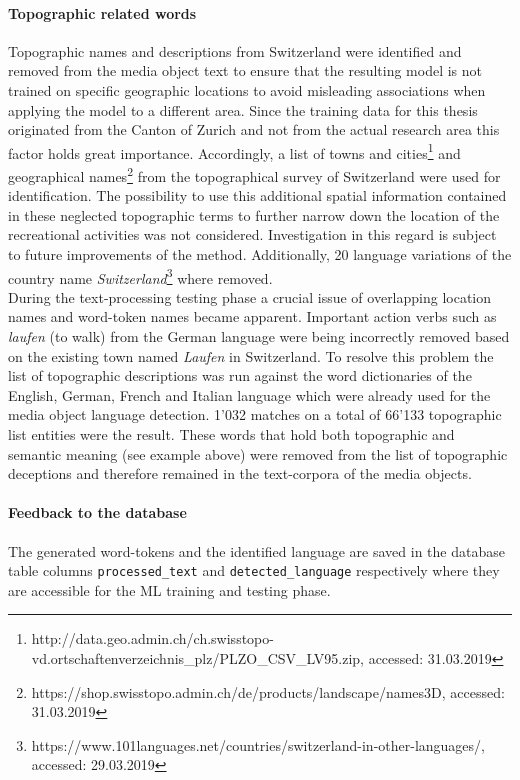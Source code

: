 \paragraph*{Topographic related words}
Topographic names and descriptions from Switzerland were identified and removed from the media object text to ensure that the resulting model is not trained on specific geographic locations to avoid misleading associations when applying the model to a different area. Since the training data for this thesis originated from the Canton of Zurich and not from the actual research area this factor holds great importance. Accordingly, a list of towns and cities\footnote{http://data.geo.admin.ch/ch.swisstopo-vd.ortschaftenverzeichnis\_plz/PLZO\_CSV\_LV95.zip, accessed: 31.03.2019} and geographical names\footnote{https://shop.swisstopo.admin.ch/de/products/landscape/names3D, accessed: 31.03.2019} from the topographical survey of Switzerland were used for identification. 
The possibility to use this additional spatial information contained in these neglected topographic terms to further narrow down the location of the recreational activities was not considered. Investigation in this regard is subject to future improvements of the method. Additionally, 20 language variations of the country name \textit{Switzerland}\footnote{https://www.101languages.net/countries/switzerland-in-other-languages/, accessed: 29.03.2019} where removed. \\

During the text-processing testing phase a crucial issue of overlapping location names and word-token names became apparent. Important action verbs such as \textit{laufen} (to walk) from the German language were being incorrectly removed based on the existing town named \textit{Laufen} in Switzerland. To resolve this problem the list of topographic descriptions was run against the word dictionaries of the English, German, French and Italian language which were already used for the media object language detection. 1'032 matches on a total of 66'133 topographic list entities were the result. These words that hold both topographic and semantic meaning (see example above) were removed from the list of topographic deceptions and therefore remained in the text-corpora of the media objects.

\paragraph*{Feedback to the database}
The generated word-tokens and the identified language are saved in the database table columns \texttt{processed\_text} and \texttt{detected\_language} respectively where they are accessible for the ML training and testing phase.

